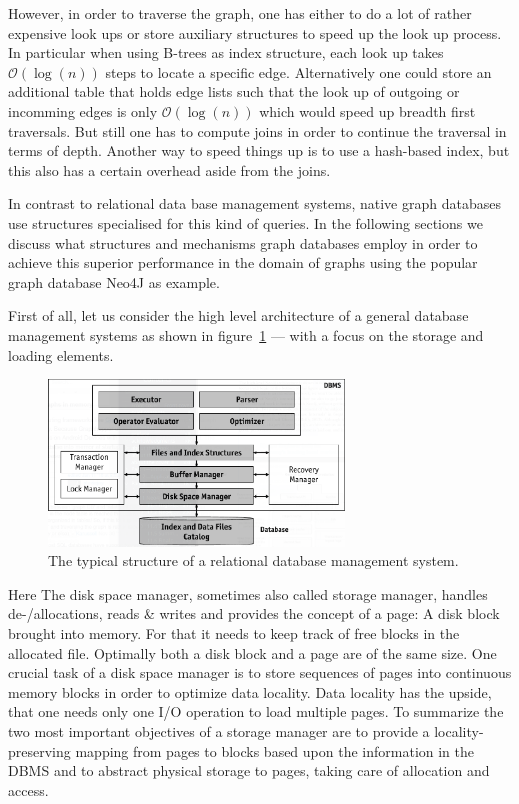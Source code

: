        However, in order to traverse the graph, one has either to do a lot of rather expensive look ups or store auxiliary structures to speed up the look up process.
        In particular when using B-trees as index structure, each look up takes $\mathcal{O}(\log(n))$ steps to locate a specific edge.
        Alternatively one could store an additional table that holds edge lists such that the look up of outgoing or incomming edges is only $\mathcal{O}(\log(n))$ which would speed up breadth first traversals.
        But still one has to compute joins in order to continue the traversal in terms of depth.
        Another way to speed things up is to use a hash-based index, but this also has a certain overhead aside from the joins.

        In contrast to relational data base management systems, native graph databases use structures specialised for this kind of queries.
        In the following sections we discuss what structures and mechanisms graph databases employ in order to achieve this superior performance in the domain of graphs using the popular graph database Neo4J as example.

        First of all, let us consider the high level architecture of a general database management systems as shown in figure~\ref{dbms_arch} --- with a focus on the storage and loading elements.

        \begin{figure}[htp]\label{dbms_arch}
        \begin{center}
        \includegraphics[keepaspectratio,width=0.7\textwidth]{img/00_intro/RDBMS.png}
        \end{center}
        \caption{The typical structure of a relational database management system.} %
        \end{figure}

        Here The disk space manager, sometimes also called storage manager, handles de-/allocations, reads \& writes and provides the concept of a page: A disk block brought into memory. 
        For that it needs to keep track of free blocks in the allocated file. Optimally both a disk block and a page are of the same size. 
        One crucial task of a disk space manager is to store sequences of pages into continuous memory blocks in order to optimize data locality.
        Data locality has the upside, that one needs only one I/O operation to load multiple pages.
        To summarize the two most important objectives of a storage manager are to provide a locality-preserving mapping from pages to blocks based upon the information in the DBMS and to abstract physical storage to pages, taking care of allocation and access.
        
